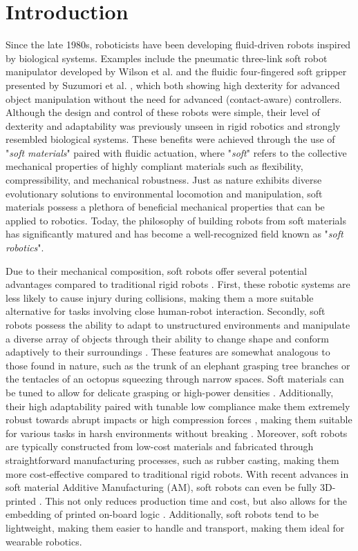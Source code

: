\section{Introduction}
\label{sec:introduction}
Since the late 1980s, roboticists have been developing fluid-driven robots inspired by biological systems. Examples include the pneumatic three-link soft robot manipulator developed by Wilson et al. \cite{Wilson1989Jun,Weisburd1988,Wilson2007} and the fluidic four-fingered soft gripper presented by Suzumori et al. \cite{Suzumori1991,Suzumori1992}, which both showing high dexterity for advanced object manipulation without the need for advanced (contact-aware) controllers. Although the design and control of these robots were simple, their level of dexterity and adaptability was previously unseen in rigid robotics and strongly resembled biological systems. These benefits were achieved through the use of "\textit{soft materials}" paired with fluidic actuation, where "\textit{soft}" refers to the collective mechanical properties of highly compliant materials such as flexibility, compressibility, and mechanical robustness. Just as nature exhibits diverse evolutionary solutions to environmental locomotion and manipulation, soft materials possess a plethora of beneficial mechanical properties that can be applied to robotics. Today, the philosophy of building robots from soft materials has significantly matured and has become a well-recognized field known as "\textit{soft robotics}".

Due to their mechanical composition, soft robots offer several potential advantages compared to traditional rigid robots \cite{Rus2015}. First, these robotic systems are less likely to cause injury during collisions, making them a more suitable alternative for tasks involving close human-robot interaction. Secondly, soft robots possess the ability to adapt to unstructured environments and manipulate a diverse array of objects through their ability to change shape and conform adaptively to their surroundings \cite{Hughes2016Nov,Marchese2015}. These features are somewhat analogous to those found in nature, such as the trunk of an elephant grasping tree branches or the tentacles of an octopus squeezing through narrow spaces. Soft materials can be tuned to allow for delicate grasping \cite{Sinatra2019Aug,Galloway2016} or high-power densities \cite{Li2017Dec}. Additionally, their high adaptability paired with tunable low compliance make them extremely robust towards abrupt impacts or high compression forces \cite{Bartlett2015}, making them suitable for various tasks in harsh environments without breaking \cite{Hawkes2017,Li2021Mar,Tolley2014Sep}. Moreover, soft robots are typically constructed from low-cost materials and fabricated through straightforward manufacturing processes, such as rubber casting, making them more cost-effective compared to traditional rigid robots. With recent advances in soft material Additive Manufacturing (AM), soft robots can even be fully 3D-printed \cite{Wallin2018Jun,Xavier2022Jun}. This not only reduces production time and cost, but also allows for the embedding of printed on-board logic \cite{Hubbard2021,Wehner2016}. Additionally, soft robots tend to be lightweight, making them easier to handle and transport, making them ideal for wearable robotics.

